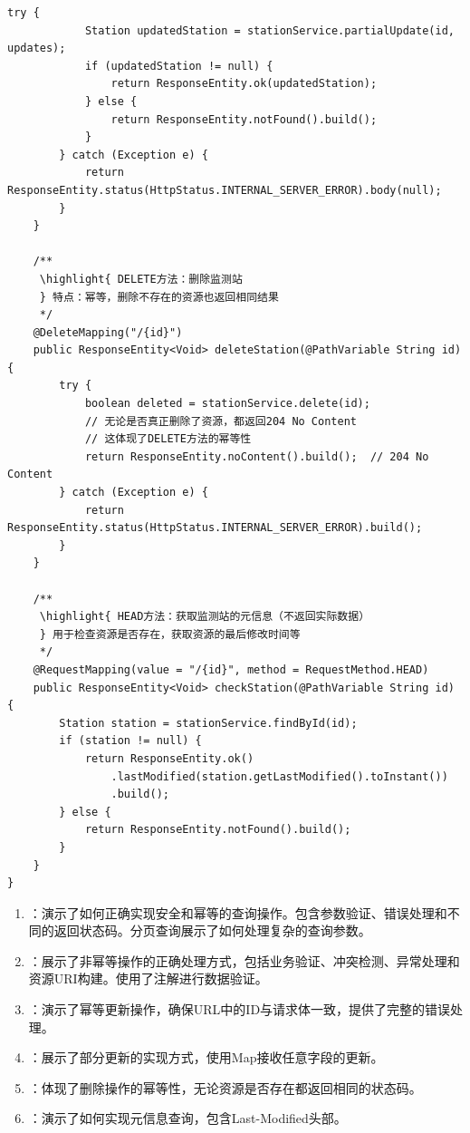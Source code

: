 \begin{lstlisting}[style=java]
        try {
            Station updatedStation = stationService.partialUpdate(id, updates);
            if (updatedStation != null) {
                return ResponseEntity.ok(updatedStation);
            } else {
                return ResponseEntity.notFound().build();
            }
        } catch (Exception e) {
            return ResponseEntity.status(HttpStatus.INTERNAL_SERVER_ERROR).body(null);
        }
    }
    
    /**
     \highlight{ DELETE方法：删除监测站
     } 特点：幂等，删除不存在的资源也返回相同结果
     */
    @DeleteMapping("/{id}")
    public ResponseEntity<Void> deleteStation(@PathVariable String id) {
        try {
            boolean deleted = stationService.delete(id);
            // 无论是否真正删除了资源，都返回204 No Content
            // 这体现了DELETE方法的幂等性
            return ResponseEntity.noContent().build();  // 204 No Content
        } catch (Exception e) {
            return ResponseEntity.status(HttpStatus.INTERNAL_SERVER_ERROR).build();
        }
    }
    
    /**
     \highlight{ HEAD方法：获取监测站的元信息（不返回实际数据）
     } 用于检查资源是否存在，获取资源的最后修改时间等
     */
    @RequestMapping(value = "/{id}", method = RequestMethod.HEAD)
    public ResponseEntity<Void> checkStation(@PathVariable String id) {
        Station station = stationService.findById(id);
        if (station != null) {
            return ResponseEntity.ok()
                .lastModified(station.getLastModified().toInstant())
                .build();
        } else {
            return ResponseEntity.notFound().build();
        }
    }
}
\end{lstlisting}


\begin{enumerate}
\def\labelenumi{\arabic{enumi}.}
\item
  ：演示了如何正确实现安全和幂等的查询操作。包含参数验证、错误处理和不同的返回状态码。分页查询展示了如何处理复杂的查询参数。
\item
  ：展示了非幂等操作的正确处理方式，包括业务验证、冲突检测、异常处理和资源URI构建。使用了注解进行数据验证。
\item
  ：演示了幂等更新操作，确保URL中的ID与请求体一致，提供了完整的错误处理。
\item
  ：展示了部分更新的实现方式，使用Map接收任意字段的更新。
\item
  ：体现了删除操作的幂等性，无论资源是否存在都返回相同的状态码。
\item
  ：演示了如何实现元信息查询，包含Last-Modified头部。
\end{enumerate}

